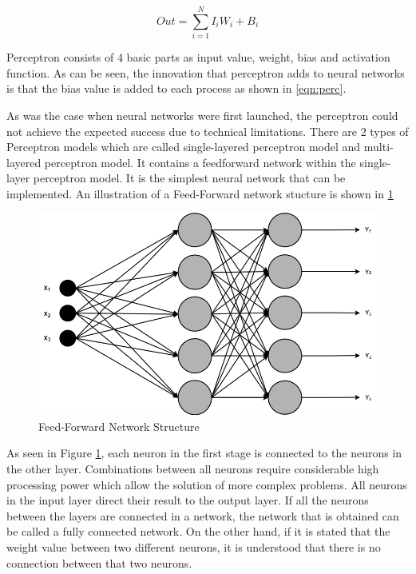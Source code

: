 \begin{equation}
\label{eqn:perc}
    Out = \sum\limits_{i=1}^{N}{I_i W_i+B_i}
\end{equation}

Perceptron consists of 4 basic parts as input value, weight, bias and activation function. As can be seen, the innovation that perceptron adds to neural networks is that the bias value is added to each process as shown in \ref{eqn:perc}.

As was the case when neural networks were first launched, the perceptron could not achieve the expected success due to technical limitations. There are 2 types of Perceptron models which are called single-layered perceptron model and multi-layered perceptron model. It contains a feedforward network within the single-layer perceptron model. It is the simplest neural network that can be implemented. An illustration of a Feed-Forward network stucture is shown in \ref{fig:feed-forwardl}

\begin{figure}[h!]
    \centering
    \includegraphics[scale=0.45]{figures/chapter3/FeedForward.png}
    \vspace*{5mm}
    \caption{Feed-Forward Network Structure}
    \label{fig:feed-forwardl}
\end{figure}

As seen in Figure \ref{fig:feed-forwardl}, each neuron in the first stage is connected to the neurons in the other layer. Combinations between all neurons require considerable high processing power which allow the solution of more complex problems. All neurons in the input layer direct their result to the output layer. If all the neurons between the layers are connected in a network, the network that is obtained can be called a fully connected network. On the other hand, if it is stated that the weight value between two different neurons, it is understood that there is no connection between that two neurons.

